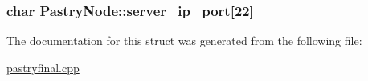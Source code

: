 \hypertarget{structPastryNode_a810f7ecb9b6479076a6ef533382b6fe1}{
\subsubsection[{server\-\_\-ip\-\_\-port}]{\setlength{\rightskip}{0pt plus 5cm}char Pastry\-Node\-::server\-\_\-ip\-\_\-port\mbox{[}22\mbox{]}}}\label{structPastryNode_a810f7ecb9b6479076a6ef533382b6fe1}


The documentation for this struct was generated from the following file\-:\begin{DoxyCompactItemize}
\item 
\hyperlink{pastryfinal_8cpp}{pastryfinal.\-cpp}\end{DoxyCompactItemize}
